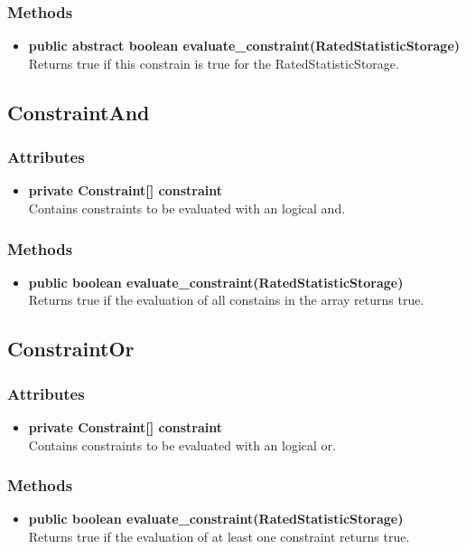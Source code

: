 \subsubsection{Methods}
\begin{itemize}
	\item \textbf{ public abstract boolean evaluate\_constraint(RatedStatisticStorage) }\\
	Returns true if this constrain is true for the RatedStatisticStorage.
\end{itemize}


\subsection{ConstraintAnd }

\subsubsection{Attributes}
\begin{itemize}
	\item \textbf{ private Constraint[] constraint }\\
	Contains constraints to be evaluated with an logical and.
\end{itemize}
\subsubsection{Methods}
\begin{itemize}
	\item \textbf{ public boolean evaluate\_constraint(RatedStatisticStorage) }\\
	Returns true if the evaluation of all constains in the array returns true.
\end{itemize}


\subsection{ConstraintOr }

\subsubsection{Attributes}
\begin{itemize}
	\item \textbf{ private Constraint[] constraint }\\
	Contains constraints to be evaluated with an logical or.
\end{itemize}
\subsubsection{Methods}
\begin{itemize}
	\item \textbf{ public boolean evaluate\_constraint(RatedStatisticStorage) }\\
	Returns true if the evaluation of at least one constraint returns true.
\end{itemize}


